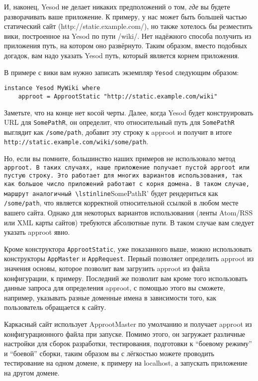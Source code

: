 И, наконец, Yesod не делает никаких предположений о том, \emph{где} вы будете разворачивать ваше приложение. К примеру, у нас может быть большей частью статический сайт (http://static.example.com/), но также хотелось бы резместить вики, построенное на Yesod по пути /wiki/. Нет надёжного способа получить из приложения путь, на котором оно развёрнуто. Таким образом, вместо подобных догадок, вам надо указать Yesod путь, который является корнем приложения.

В примере с вики вам нужно записать экземпляр \lstinline'Yesod' следующим образом:

\begin{lstlisting}
instance Yesod MyWiki where
    approot = ApprootStatic "http://static.example.com/wiki"
\end{lstlisting}

Заметьте, что на конце нет косой черты. Далее, когда Yesod будет конструировать URL для \lstinline'SomePathR', он определит, что относительный путь для \lstinline'SomePathR' выглядит как \lstinline'/some/path', добавит эту строку к approot и получит в итоге \lstinline'http://static.example.com/wiki/some/path'.

Но, если вы помните, большинство наших примеров не использовало метод \lstinline'approot. В таких случаях, наше приложение получает пустой approot или пустую строку. Это работает для многих вариантов использования, так как большое число приложений работают с корня домена. В таком случае, маршрут аналогичный \lstinline'SomePathR' будет рендериться как \lstinline'/some/path', что является корректной относительной ссылкой в любом месте вашего сайта. Однако для некоторых вариантов использования (ленты Atom/RSS или XML карты сайтов) требуются абсолютные пути. В таком случае вам следует указать approot явно.

Кроме конструктора \lstinline'ApprootStatic', уже показанного выше, можно использовать конструкторы \lstinline'AppMaster' и \lstinline'AppRequest'. Первый позволяет определить approot из значения основы, которое позволит вам загрузить approot из файла конфигурации, к примеру. Последний же позволит вам кроме того использовать данные запроса для определения approot, с помощью этого вы сможете, например, указывать разные доменные имена в зависимости того, как пользователь обращается к сайту.

Каркасный сайт использует ApprootMaster по умолчанию и получает approot из конфигурационного файла при запуске. Помимо этого, он загружает различные настройки для сборок разработки, тестирования, подготовки к ``боевому режиму'' и ``боевой'' сборки, таким образом вы с лёгкостью можете проводить тестирование на одном домене, к примеру на localhost, а запускать приложение на другом домене.

